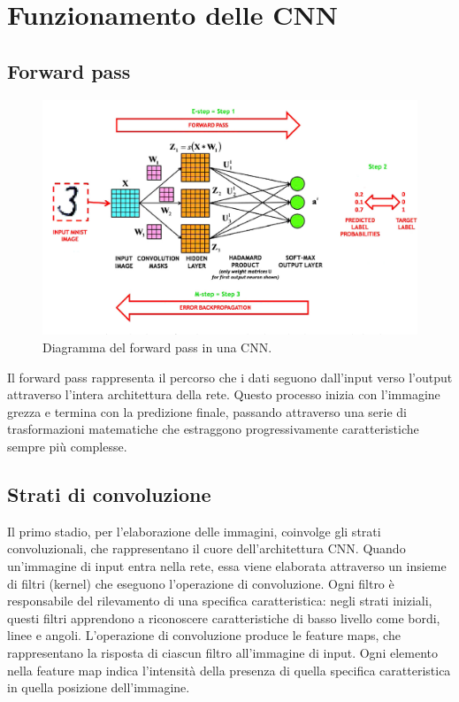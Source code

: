 \documentclass[a4paper,12pt]{report}
\begin{document}
	\section{Funzionamento delle CNN}
	
	\subsection{Forward pass}
	\begin{figure}[H]
		\centering
		\includegraphics[width=1.0\textwidth]{img/cnn_fp.png}
		\caption{Diagramma del forward pass in una CNN.}
	\end{figure}
	Il forward pass rappresenta il percorso che i dati seguono dall’input verso l’output attraverso l’intera architettura della rete. Questo processo inizia con l’immagine grezza e termina con la predizione finale, passando attraverso una serie di trasformazioni matematiche che estraggono progressivamente caratteristiche sempre più complesse.
	
	\subsection{Strati di convoluzione}
	Il primo stadio, per l'elaborazione delle immagini, coinvolge gli strati convoluzionali, che rappresentano il cuore dell’architettura CNN. Quando un’immagine di input entra nella rete, essa viene elaborata attraverso un insieme di filtri (kernel) che eseguono l’operazione di convoluzione. Ogni filtro è responsabile del rilevamento di una specifica caratteristica: negli strati iniziali, questi filtri apprendono a riconoscere caratteristiche di basso livello come bordi, linee e angoli. L’operazione di convoluzione produce le feature maps, che rappresentano la risposta di ciascun filtro all’immagine di input. Ogni elemento nella feature map indica l’intensità della presenza di quella specifica caratteristica in quella posizione dell’immagine.
	
\end{document}
